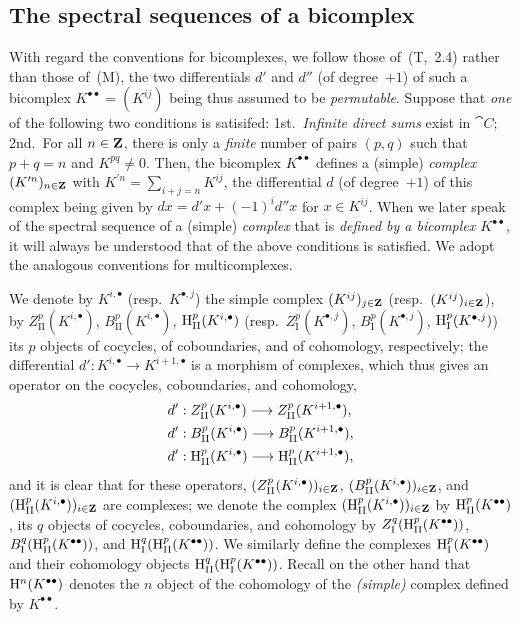 \subsection{The spectral sequences of a bicomplex}
\label{subsection:0.11.4}

\begin{env}[11.3.1]
\label{0.11.3.1}
With regard the conventions for bicomplexes, we follow those of~(T,~2.4) rather than those of~(M), the two differentials $d'$ and $d''$ (of degree~$+1$) of such a bicomplex $K^{\bullet\bullet}=(K^{ij})$ being thus assumed to be \emph{permutable}.
Suppose that \emph{one} of the following two conditions is satisifed: 1st.~\emph{Infinite direct sums} exist in $\cat{C}$; 2nd.~For all $n\in\mathbf{Z}$, there is only a \emph{finite} number of pairs $(p,q)$ such that $p+q=n$ and $K^{pq}\neq 0$.
Then, the bicomplex $K^{\bullet\bullet}$ defines a (simple) \emph{complex} $(K^{\prime n})_{n\in\mathbf{Z}}$ with $K^{\prime n}=\sum_{i+j=n}K^{ij}$, the differential $d$ (of degree~$+1$) of this complex being given by $dx=d'x+(-1)^i d''x$ for $x\in K^{ij}$.
When we later speak of the spectral sequence of a (simple) \emph{complex} that is \emph{defined by a bicomplex $K^{\bullet\bullet}$}, it will always be understood that of the above conditions is satisfied.
We adopt the analogous conventions for multicomplexes.

We denote by $K^{i,\bullet}$ (resp.~$K^{\bullet,j}$) the simple complex $(K^{ij})_{j\in\mathbf{Z}}$ (resp.~$(K^{ij})_{i\in\mathbf{Z}}$), by $Z_\text{II}^p(K^{i,\bullet})$, $B_\text{II}^p(K^{i,\bullet})$, $\mathrm{H}_\text{II}^p(K^{i,\bullet})$ (resp.~$Z_\text{I}^p(K^{\bullet,j})$, $B_\text{I}^p(K^{\bullet,j})$, $\mathrm{H}_\text{I}^p(K^{\bullet,j})$) its $p$ objects of cocycles, of coboundaries, and of cohomology, respectively; the differential $d':K^{i,\bullet}\to K^{i+1,\bullet}$ is a morphism of complexes, which thus gives an operator on the cocycles, coboundaries, and cohomology,
\begin{align*}
  d'&:Z_\text{II}^p(K^{i,\bullet})\to Z_\text{II}^p(K^{i+1,\bullet}),\\
  d'&:B_\text{II}^p(K^{i,\bullet})\to B_\text{II}^p(K^{i+1,\bullet}),\\
  d'&:\HH_\text{II}^p(K^{i,\bullet})\to\HH_\text{II}^p(K^{i+1,\bullet}),
\end{align*}
and it is clear that for these operators, $(Z_\text{II}^p(K^{i,\bullet}))_{i\in\mathbf{Z}}$, $(B_\text{II}^p(K^{i,\bullet}))_{i\in\mathbf{Z}}$, and $(\mathrm{H}_\text{II}^p(K^{i,\bullet}))_{i\in\mathbf{Z}}$ are complexes; we denote the complex $(\mathrm{H}_\text{II}^p(K^{i,\bullet}))_{i\in\mathbf{Z}}$ by $\mathrm{H}_\text{II}^p(K^{\bullet\bullet})$, its $q$ objects of cocycles, coboundaries, and cohomology by $Z_\text{I}^q(\mathrm{H}_\text{II}^p(K^{\bullet\bullet}))$, $B_\text{I}^q(\mathrm{H}_\text{II}^p(K^{\bullet\bullet}))$, and $\mathrm{H}_\text{I}^q(\mathrm{H}_\text{II}^p(K^{\bullet\bullet}))$.
We similarly define the complexes $\mathrm{H}_\text{I}^p(K^{\bullet\bullet})$ and their cohomology objects $\mathrm{H}_\text{II}^q(\mathrm{H}_\text{I}^p(K^{\bullet\bullet}))$.
Recall on the other hand that $\mathrm{H}^n(K^{\bullet\bullet})$ denotes the $n$ object of the cohomology of the \emph{(simple)} complex defined by $K^{\bullet\bullet}$.
\end{env}

